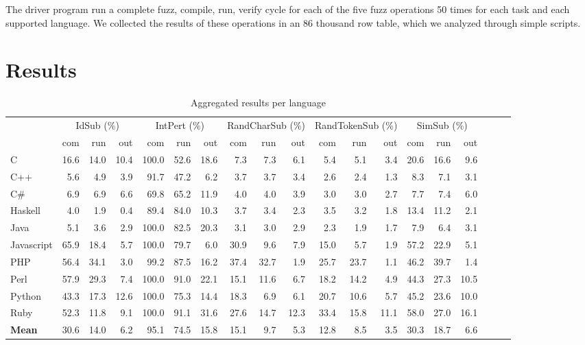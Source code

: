 \documentclass[10pt]{sigplanconf}
\begin{document}
The driver program run a complete fuzz, compile, run, verify cycle
for each of the five fuzz operations 50 times for
each task and each supported language.
We collected the results of these operations in an 86 thousand row
table,
which we analyzed through simple scripts.

\section{Results} %
\label{sec:results}

\begin{table*}
\begin{center}
\begin{tabular}{ l r r r r r r r r r r r r r r r r r r }
 & \multicolumn{3}{c}{IdSub (\%)} & \multicolumn{3}{c}{IntPert (\%)} & \multicolumn{3}{c}{RandCharSub (\%)} & \multicolumn{3}{c}{RandTokenSub (\%)} & \multicolumn{3}{c}{SimSub (\%)}\\
           & com  & run  & out  & com   & run  & out   & com  & run  & out  & com  & run  & out  & com  & run  & out\\
\hline
C          & 16.6 & 14.0 & 10.4 & 100.0 & 52.6 & 18.6  & 7.3  & 7.3  & 6.1  & 5.4  & 5.1  & 3.4  & 20.6 & 16.6 & 9.6 \\
C++        & 5.6  & 4.9  & 3.9  & 91.7  & 47.2 & 6.2   & 3.7  & 3.7  & 3.4  & 2.6  & 2.4  & 1.3  & 8.3  & 7.1  & 3.1 \\
C\#        & 6.9  & 6.9  & 6.6  & 69.8  & 65.2 & 11.9  & 4.0  & 4.0  & 3.9  & 3.0  & 3.0  & 2.7  & 7.7  & 7.4  & 6.0 \\
Haskell    & 4.0  & 1.9  & 0.4  & 89.4  & 84.0 & 10.3  & 3.7  & 3.4  & 2.3  & 3.5  & 3.2  & 1.8  & 13.4 & 11.2 & 2.1 \\
Java       & 5.1  & 3.6  & 2.9  & 100.0 & 82.5 & 20.3  & 3.1  & 3.0  & 2.9  & 2.3  & 1.9  & 1.7  & 7.9  & 6.4  & 3.1 \\
Javascript & 65.9 & 18.4 & 5.7  & 100.0 & 79.7 & 6.0   & 30.9 & 9.6  & 7.9  & 15.0 & 5.7  & 1.9  & 57.2 & 22.9 & 5.1 \\
PHP        & 56.4 & 34.1 & 3.0  & 99.2  & 87.5 & 16.2  & 37.4 & 32.7 & 1.9  & 25.7 & 23.7 & 1.1  & 46.2 & 39.7 & 1.4 \\
Perl       & 57.9 & 29.3 & 7.4  & 100.0 & 91.0 & 22.1  & 15.1 & 11.6 & 6.7  & 18.2 & 14.2 & 4.9  & 44.3 & 27.3 & 10.5 \\
Python     & 43.3 & 17.3 & 12.6 & 100.0 & 75.3 & 14.4  & 18.3 & 6.9  & 6.1  & 20.7 & 10.6 & 5.7  & 45.2 & 23.6 & 10.0 \\
Ruby       & 52.3 & 11.8 & 9.1  & 100.0 & 91.1 & 31.6  & 27.6 & 14.7 & 12.3 & 33.4 & 15.8 & 11.1 & 58.0 & 27.0 & 16.1 \\
\hline
\textbf{Mean} & 30.6 & 14.0 & 6.2  & 95.1  & 74.5 & 15.8  & 15.1 & 9.7  & 5.3  & 12.8 & 8.5  & 3.5  & 30.3 & 18.7 & 6.6 \\
\end{tabular}
\end{center}
\caption{Aggregated results per language}
\label{tbl:aggregated-per-language}
\end{table*}
\end{document}
